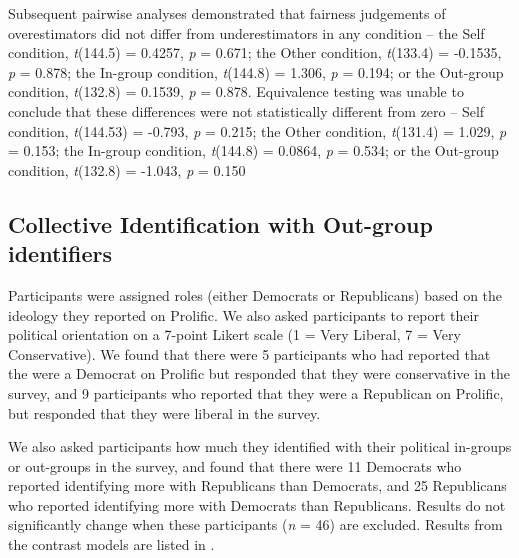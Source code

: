 \documentclass[12pt,]{article}
\begin{document}
Subsequent pairwise analyses demonstrated that fairness judgements of overestimators did not differ from underestimators in any condition -- the Self condition, \emph{t}(144.5) = 0.4257, \emph{p} = 0.671; the Other condition, \emph{t}(133.4) = -0.1535, \emph{p} = 0.878; the In-group condition, \emph{t}(144.8) = 1.306, \emph{p} = 0.194; or the Out-group condition, \emph{t}(132.8) = 0.1539, \emph{p} = 0.878. Equivalence testing was unable to conclude that these differences were not statistically different from zero -- Self condition,  \emph{t}(144.53) = -0.793, \emph{p} = 0.215; the Other condition, \emph{t}(131.4) = 1.029, \emph{p} = 0.153; the In-group condition, \emph{t}(144.8) = 0.0864, \emph{p} = 0.534; or the Out-group condition, \emph{t}(132.8) = -1.043, \emph{p} = 0.150



\newpage
\subsection{Collective Identification with Out-group identifiers}
\label{appendix:mismatch}


Participants were assigned roles (either Democrats or Republicans) based on the ideology they reported on Prolific. We also asked participants to report their political orientation on a 7-point Likert scale (1 = Very Liberal, 7 = Very Conservative). We found that there were 5 participants who had reported that the were a Democrat on Prolific but responded that they were conservative in the survey, and 9 participants who reported that they were a Republican on Prolific, but responded that they were liberal in the survey. 

We also asked participants how much they identified with their political in-groups or out-groups in the survey, and found that there were 11 Democrats who reported identifying more with Republicans than Democrats, and 25 Republicans who reported identifying more with Democrats than Republicans. Results do not significantly change when these participants (\emph{n} = 46) are excluded.  Results from the contrast models are listed in . 


\vspace{0.6cm}
\end{document}
